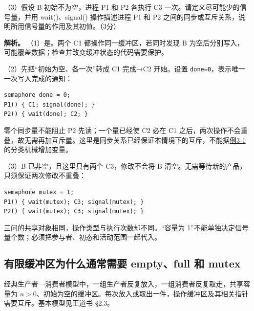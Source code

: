 （3）假设 B 初始不为空，进程 P1 和 P2 各执行 C3 一次。请定义尽可能少的信号量，并用 wait()、signal() 操作描述进程 P1 和 P2 之间的同步或互斥关系，说明所用信号量的作用及其初值。（3分）


\textbf{解析。} （1）是。两个 C1 都操作同一缓冲区，若同时发现 B 为空后分别写入，可能覆盖数据；检查并改变缓冲状态的代码需要保护。

（2）先把``初始为空、各一次''转成 C1 完成→C2 开始。设置 \allowbreak{}\texttt{done=0}，表示唯一一次写入完成的通知：

\par\medskip\noindent
\begin{minipage}{\linewidth}
\begin{verbatim}
semaphore done = 0;
P1() { C1; signal(done); }
P2() { wait(done); C2; }
\end{verbatim}
\end{minipage}\par\medskip

零个同步量不能阻止 P2 先读；一个量已经使 C2 必在 C1 之后，两次操作不会重叠，故无需再加互斥量。这里是同步关系已经保证本情境下的互斥，不能据\hyperref[ex-err11]{例3-1}的分类机械增加变量。

（3）B 已非空，且这里只有两个 C3，修改不会将 B 清空。无需等待新的产品，只须保证两次修改不重叠：

\par\medskip\noindent
\begin{minipage}{\linewidth}
\begin{verbatim}
semaphore mutex = 1;
P1() { wait(mutex); C3; signal(mutex); }
P2() { wait(mutex); C3; signal(mutex); }
\end{verbatim}
\end{minipage}\par\medskip

三问的共享对象相同，操作类型与执行次数却不同。``容量为 1''不能单独决定信号量个数；必须把参与者、初态和活动范围一起代入。

\subsection{有限缓冲区为什么通常需要 empty、full 和 mutex}\label{os-c03-h220}

经典生产者---消费者模型中，一组生产者反复放入，一组消费者反复取走，共享容量为 \(n>0\)、初始为空的缓冲区。每次放入或取出一件，操作缓冲区及其相关指针需要互斥。基本模型见王道书 §2.3。

